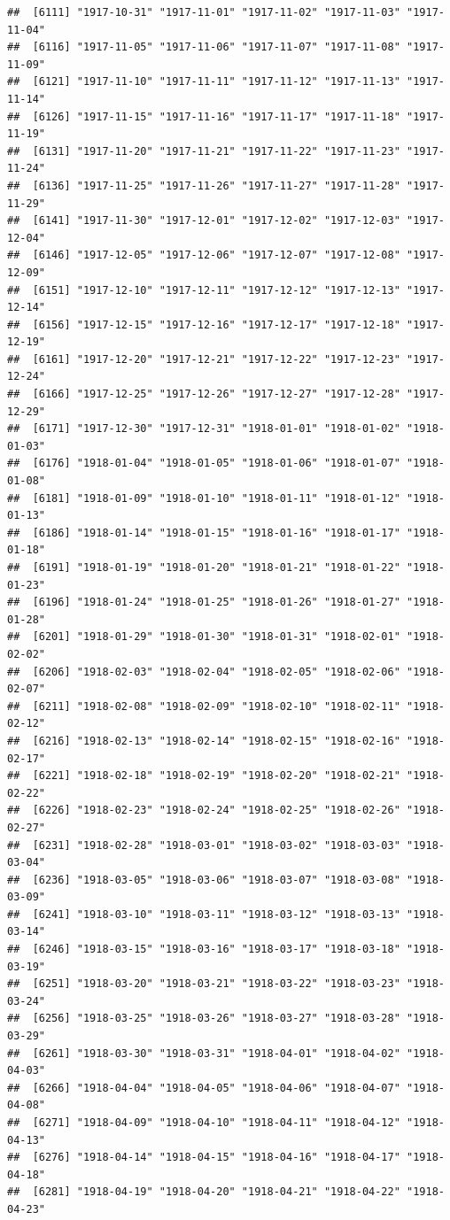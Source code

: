 \documentclass{article}\usepackage[]{graphicx}\usepackage[]{color}
\makeatletter
\newenvironment{kframe}{%
 \def\at@end@of@kframe{}%
 \ifinner\ifhmode%
  \def\at@end@of@kframe{\end{minipage}}%
  \begin{minipage}{\columnwidth}%
 \fi\fi%
 \def\FrameCommand##1{\hskip\@totalleftmargin \hskip-\fboxsep
 \colorbox{shadecolor}{##1}\hskip-\fboxsep
     \hskip-\linewidth \hskip-\@totalleftmargin \hskip\columnwidth}%
 \MakeFramed {\advance\hsize-\width
   \@totalleftmargin\z@ \linewidth\hsize
   \@setminipage}}%
 {\par\unskip\endMakeFramed%
 \at@end@of@kframe}
\newenvironment{knitrout}{}{} %
\makeatother
\begin{document}
\begin{description}
\begin{knitrout}
\begin{kframe}
\begin{verbatim}
##  [6111] "1917-10-31" "1917-11-01" "1917-11-02" "1917-11-03" "1917-11-04"
##  [6116] "1917-11-05" "1917-11-06" "1917-11-07" "1917-11-08" "1917-11-09"
##  [6121] "1917-11-10" "1917-11-11" "1917-11-12" "1917-11-13" "1917-11-14"
##  [6126] "1917-11-15" "1917-11-16" "1917-11-17" "1917-11-18" "1917-11-19"
##  [6131] "1917-11-20" "1917-11-21" "1917-11-22" "1917-11-23" "1917-11-24"
##  [6136] "1917-11-25" "1917-11-26" "1917-11-27" "1917-11-28" "1917-11-29"
##  [6141] "1917-11-30" "1917-12-01" "1917-12-02" "1917-12-03" "1917-12-04"
##  [6146] "1917-12-05" "1917-12-06" "1917-12-07" "1917-12-08" "1917-12-09"
##  [6151] "1917-12-10" "1917-12-11" "1917-12-12" "1917-12-13" "1917-12-14"
##  [6156] "1917-12-15" "1917-12-16" "1917-12-17" "1917-12-18" "1917-12-19"
##  [6161] "1917-12-20" "1917-12-21" "1917-12-22" "1917-12-23" "1917-12-24"
##  [6166] "1917-12-25" "1917-12-26" "1917-12-27" "1917-12-28" "1917-12-29"
##  [6171] "1917-12-30" "1917-12-31" "1918-01-01" "1918-01-02" "1918-01-03"
##  [6176] "1918-01-04" "1918-01-05" "1918-01-06" "1918-01-07" "1918-01-08"
##  [6181] "1918-01-09" "1918-01-10" "1918-01-11" "1918-01-12" "1918-01-13"
##  [6186] "1918-01-14" "1918-01-15" "1918-01-16" "1918-01-17" "1918-01-18"
##  [6191] "1918-01-19" "1918-01-20" "1918-01-21" "1918-01-22" "1918-01-23"
##  [6196] "1918-01-24" "1918-01-25" "1918-01-26" "1918-01-27" "1918-01-28"
##  [6201] "1918-01-29" "1918-01-30" "1918-01-31" "1918-02-01" "1918-02-02"
##  [6206] "1918-02-03" "1918-02-04" "1918-02-05" "1918-02-06" "1918-02-07"
##  [6211] "1918-02-08" "1918-02-09" "1918-02-10" "1918-02-11" "1918-02-12"
##  [6216] "1918-02-13" "1918-02-14" "1918-02-15" "1918-02-16" "1918-02-17"
##  [6221] "1918-02-18" "1918-02-19" "1918-02-20" "1918-02-21" "1918-02-22"
##  [6226] "1918-02-23" "1918-02-24" "1918-02-25" "1918-02-26" "1918-02-27"
##  [6231] "1918-02-28" "1918-03-01" "1918-03-02" "1918-03-03" "1918-03-04"
##  [6236] "1918-03-05" "1918-03-06" "1918-03-07" "1918-03-08" "1918-03-09"
##  [6241] "1918-03-10" "1918-03-11" "1918-03-12" "1918-03-13" "1918-03-14"
##  [6246] "1918-03-15" "1918-03-16" "1918-03-17" "1918-03-18" "1918-03-19"
##  [6251] "1918-03-20" "1918-03-21" "1918-03-22" "1918-03-23" "1918-03-24"
##  [6256] "1918-03-25" "1918-03-26" "1918-03-27" "1918-03-28" "1918-03-29"
##  [6261] "1918-03-30" "1918-03-31" "1918-04-01" "1918-04-02" "1918-04-03"
##  [6266] "1918-04-04" "1918-04-05" "1918-04-06" "1918-04-07" "1918-04-08"
##  [6271] "1918-04-09" "1918-04-10" "1918-04-11" "1918-04-12" "1918-04-13"
##  [6276] "1918-04-14" "1918-04-15" "1918-04-16" "1918-04-17" "1918-04-18"
##  [6281] "1918-04-19" "1918-04-20" "1918-04-21" "1918-04-22" "1918-04-23"

\end{verbatim}
\end{kframe}
\end{knitrout}
\end{description}
\end{document}
